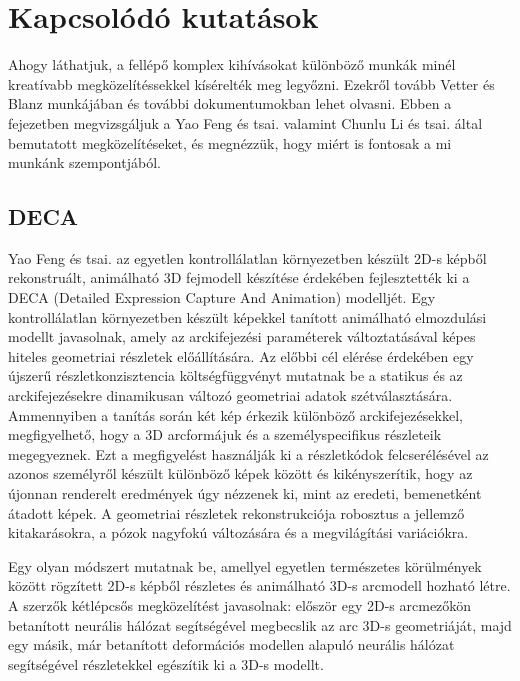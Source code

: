 \documentclass[12pt,a4]{article}
\begin{document}
    
    \section{Kapcsolódó kutatások}

        Ahogy láthatjuk, a fellépő komplex kihívásokat különböző munkák minél kreatívabb megközelítéssekkel kísérelték meg legyőzni. Ezekről tovább \cite{blanzvetter}Vetter és Blanz  munkájában és további dokumentumokban lehet olvasni. Ebben a fejezetben megvizsgáljuk a \cite{deca}Yao Feng és tsai. valamint \cite{focus}Chunlu Li és tsai. által bemutatott megközelítéseket, és megnézzük, hogy miért is fontosak a mi munkánk szempontjából.

        \subsection{DECA} \label{DECA}
 	
            \cite{deca}Yao Feng és tsai. az egyetlen kontrollálatlan környezetben készült 2D-s képből rekonstruált, animálható 3D fejmodell készítése érdekében fejlesztették ki a DECA (Detailed Expression Capture And Animation) modelljét. Egy kontrollálatlan környezetben készült képekkel tanított animálható elmozdulási modellt javasolnak, amely az arckifejezési paraméterek változtatásával képes hiteles geometriai részletek előállítására. Az előbbi cél elérése érdekében egy újszerű részletkonzisztencia költségfüggvényt mutatnak be a statikus és az arckifejezésekre dinamikusan változó geometriai adatok szétválasztására. Ammennyiben a tanítás során két kép érkezik különböző arckifejezésekkel, megfigyelhető, hogy a 3D arcformájuk és a személyspecifikus részleteik megegyeznek. Ezt a megfigyelést használják ki a részletkódok felcserélésével az azonos személyről készült különböző képek között és kikényszerítik, hogy az újonnan renderelt eredmények úgy nézzenek ki, mint az eredeti, bemenetként átadott képek. A geometriai részletek rekonstrukciója robosztus a jellemző kitakarásokra, a pózok nagyfokú változására és a megvilágítási variációkra.
    
            Egy olyan módszert mutatnak be, amellyel egyetlen természetes körülmények között rögzített 2D-s képből részletes és animálható 3D-s arcmodell hozható létre. A szerzők kétlépcsős megközelítést javasolnak: először egy 2D-s arcmezőkön betanított neurális hálózat segítségével megbecslik az arc 3D-s geometriáját, majd egy másik, már betanított deformációs modellen alapuló neurális hálózat segítségével részletekkel egészítik ki a 3D-s modellt.
    
\end{document}
